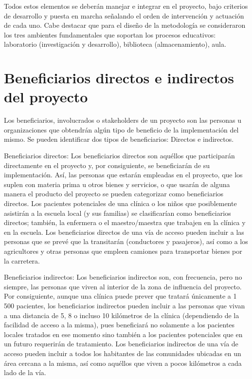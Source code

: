 \documentclass[12pt, a4paper, nofontenc, numbers=endperiod]{apa7}
\begin{document}
{\setlength{\parindent}{1.27cm}Todos estos elementos se deberán manejar e integrar en el proyecto, bajo criterios de desarrollo y puesta en marcha señalando el orden de intervención y actuación de cada uno. Cabe destacar que para el diseño de la metodología se consideraron los tres ambientes fundamentales que soportan los procesos educativos: laboratorio (investigación y desarrollo), biblioteca (almacenamiento), aula.

		
\section*{\normalsize \centering Beneficiarios directos e indirectos del proyecto}
\setlength{\parindent}{1.27cm}Los beneficiarios, involucrados o stakeholders de un proyecto son las personas u organizaciones que obtendrán algún tipo de beneficio de la implementación del mismo. Se pueden identificar dos tipos de beneficiarios: Directos e indirectos.

\setlength{\parindent}{1.27cm}Beneficiarios directos: Los beneficiarios directos son aquéllos que participarán directamente en el proyecto y, por consiguiente, se beneficiarán de su implementación. Así, las personas que estarán empleadas en el proyecto, que los suplen con materia prima u otros bienes y servicios, o que usarán de alguna manera el producto del proyecto se pueden categorizar como beneficiarios directos. Los pacientes potenciales de una clínica o los niños que posiblemente asistirán a la escuela local (y sus familias) se clasificarían como beneficiarios directos; también, la enfermera o el maestro/maestra que trabajen en la clínica y en la escuela. Los beneficiarios directos de una vía de acceso pueden incluir a las personas que se prevé que la transitarán (conductores y pasajeros), así como a los agricultores y otras personas que empleen camiones para transportar bienes por la carretera.

\setlength{\parindent}{1.27cm}Beneficiarios indirectos: Los beneficiarios indirectos son, con frecuencia, pero no siempre, las personas que viven al interior de la zona de influencia del proyecto. Por consiguiente, aunque una clínica puede prever que tratará únicamente a 1 500 pacientes, los beneficiarios indirectos pueden incluir a las personas que vivan a una distancia de 5, 8 o incluso 10 kilómetros de la clínica (dependiendo de la facilidad de acceso a la misma), pues beneficiará no solamente a los pacientes locales tratados en ese momento sino también a los pacientes potenciales que en un futuro requerirán de tratamiento. Los beneficiarios indirectos de una vía de acceso pueden incluir a todos los habitantes de las comunidades ubicadas en un área cercana a la misma, así como aquéllos que viven a pocos kilómetros a cada lado de la vía.

}
\end{document}
